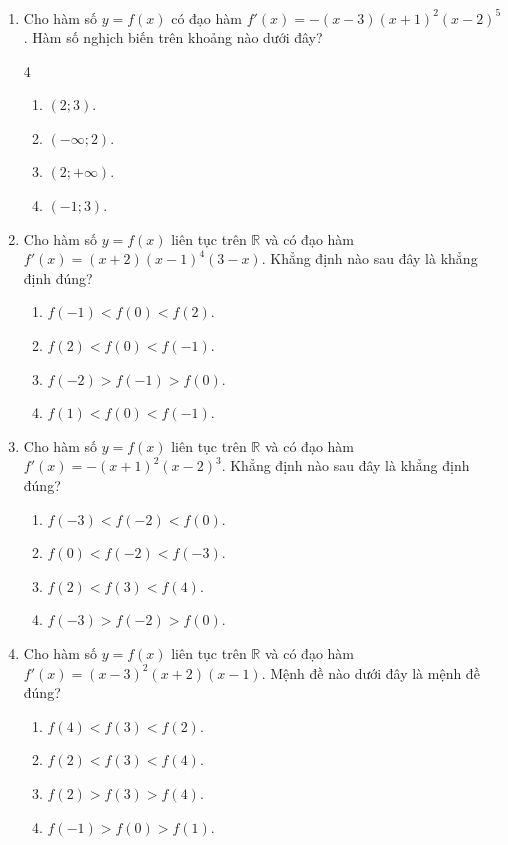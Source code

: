 \documentclass[12pt]{article}
\begin{document}
\begin{enumerate}[label=\textbf{Câu \arabic*.}]
		\item Cho hàm số $y = f(x)$ có đạo hàm $f'(x) = -(x - 3)(x + 1)^2(x - 2)^5$. Hàm số nghịch biến trên khoảng nào dưới đây?
		\begin{multicols}{4}
			\begin{enumerate}[label=\textbf{\Alph*.}]
				\item $(2; 3)$.
				\item $(-\infty; 2)$.
				\item $(2; +\infty)$.
				\item $(-1; 3)$.
			\end{enumerate}
		\end{multicols}
		
		\item Cho hàm số $y = f(x)$ liên tục trên $\mathbb{R}$ và có đạo hàm $f'(x) = (x + 2)(x - 1)^4(3 - x)$. Khẳng định nào sau đây là khẳng định đúng?
		\begin{enumerate}[label=\textbf{\Alph*.}]
			\item $f(-1) < f(0) < f(2)$.
			\item $f(2) < f(0) < f(-1)$.
			\item $f(-2) > f(-1) > f(0)$.
			\item $f(1) < f(0) < f(-1)$.
		\end{enumerate}
		
		\item Cho hàm số $y = f(x)$ liên tục trên $\mathbb{R}$ và có đạo hàm $f'(x) = -(x + 1)^2(x - 2)^3$. Khẳng định nào sau đây là khẳng định đúng?
		\begin{enumerate}[label=\textbf{\Alph*.}]
			\item $f(-3) < f(-2) < f(0)$.
			\item $f(0) < f(-2) < f(-3)$.
			\item $f(2) < f(3) < f(4)$.
			\item $f(-3) > f(-2) > f(0)$.
		\end{enumerate}
		
		\item Cho hàm số $y = f(x)$ liên tục trên $\mathbb{R}$ và có đạo hàm $f'(x) = (x - 3)^2(x + 2)(x - 1)$. Mệnh đề nào dưới đây là mệnh đề đúng?
		\begin{enumerate}[label=\textbf{\Alph*.}]
			\item $f(4) < f(3) < f(2)$.
			\item $f(2) < f(3) < f(4)$.
			\item $f(2) > f(3) > f(4)$.
			\item $f(-1) > f(0) > f(1)$.
		\end{enumerate}
		

\end{enumerate}
\end{document}
